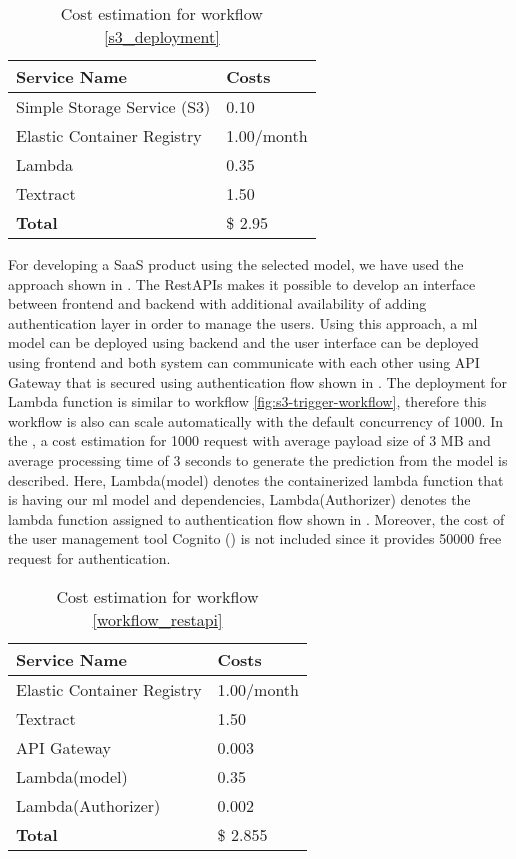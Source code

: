 \begin{table}[!ht]
    \centering
    \begin{tabular}{ll}
        \toprule
         \textbf{Service Name}& \textbf{Costs}  \\ \midrule
         Simple Storage Service (S3)& 0.10 \\
         Elastic Container Registry & 1.00/month\\
         Lambda & 0.35 \\
         Textract& 1.50 \\ \midrule 
         \textbf{Total} & \$ 2.95 \\ \bottomrule
         
    \end{tabular}
    \caption{Cost estimation for workflow \ref{s3_deployment}}
    \label{tab:cost_s3}
\end{table}


 For developing a SaaS product using the selected model, we have used the approach shown in . The RestAPIs makes it possible to develop an interface between frontend and backend with additional availability of adding authentication layer in order to manage the users. Using this approach, a \acrshort{ml} model can be deployed using backend and the user interface can be deployed using frontend and both system can communicate with each other using API Gateway that is secured using authentication flow shown in . The deployment for Lambda function is similar to workflow \ref{fig:s3-trigger-workflow}, therefore this workflow is also can scale automatically with the default concurrency of 1000. 
 In the , a cost estimation for 1000 request with average payload size of 3 MB and average  processing time of 3 seconds to generate the prediction from the model is described. Here, Lambda(model) denotes the containerized lambda function that is having our \acrshort{ml} model and dependencies, Lambda(Authorizer) denotes the lambda function assigned to authentication flow shown in . Moreover, the cost of the user management tool Cognito () is not included since it provides 50000 free request for authentication.

 \begin{table}[!ht]
     \centering
     \begin{tabular}{ll}
        \toprule
        \textbf{Service Name}& \textbf{Costs}  \\ \midrule
        Elastic Container Registry& 1.00/month\\
        Textract  & 1.50 \\
        API Gateway & 0.003 \\
        Lambda(model) & 0.35\\
        Lambda(Authorizer) & 0.002\\ \midrule
        \textbf{Total} & \$ 2.855\\ \bottomrule
        
     \end{tabular}
     \caption{Cost estimation for workflow \ref{workflow_restapi}}
     \label{tab:cost_api}
 \end{table}


